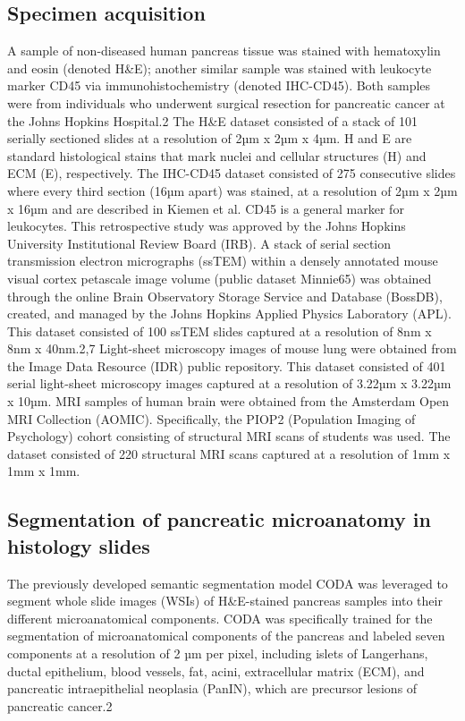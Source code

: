 \begin{refsection}
    \subsection{Specimen acquisition}
    A sample of non-diseased human pancreas tissue was stained with hematoxylin and eosin (denoted H\&E); another similar sample was stained with leukocyte marker CD45 via immunohistochemistry (denoted IHC-CD45). Both samples were from individuals who underwent surgical resection for pancreatic cancer at the Johns Hopkins Hospital.2 The H\&E dataset consisted of a stack of 101 serially sectioned slides at a resolution of 2µm x 2µm x 4µm. H and E are standard histological stains that mark nuclei and cellular structures (H) and ECM (E), respectively. The IHC-CD45 dataset consisted of 275 consecutive slides where every third section (16µm apart) was stained, at a resolution of 2µm x 2µm x 16µm and are described in Kiemen et al.\cite{kiemen2024a} CD45 is a general marker for leukocytes. This retrospective study was approved by the Johns Hopkins University Institutional Review Board (IRB).
    A stack of serial section transmission electron micrographs (ssTEM) within a densely annotated mouse visual cortex petascale image volume (public dataset Minnie65) was obtained through the online Brain Observatory Storage Service and Database (BossDB), created, and managed by the Johns Hopkins Applied Physics Laboratory (APL). This dataset consisted of 100 ssTEM slides captured at a resolution of 8nm x 8nm x 40nm.2,7
    Light-sheet microscopy images of mouse lung were obtained from the Image Data Resource (IDR) public repository.\cite{williams2017a,kubota2021a} This dataset consisted of 401 serial light-sheet microscopy images captured at a resolution of 3.22µm x 3.22µm x 10µm.
    MRI samples of human brain were obtained from the Amsterdam Open MRI Collection (AOMIC)\cite{snoek2021a}. Specifically, the PIOP2 (Population Imaging of Psychology) cohort consisting of structural MRI scans of students was used. The dataset consisted of 220 structural MRI scans captured at a resolution of 1mm x 1mm x 1mm. 
    
    \subsection{Segmentation of pancreatic microanatomy in histology slides}
    The previously developed semantic segmentation model CODA was leveraged to segment whole slide images (WSIs) of H\&E-stained pancreas samples into their different microanatomical components\cite{kiemen2022a,Crawford2024Combined,Braxton20243D}. CODA was specifically trained for the segmentation of microanatomical components of the pancreas and labeled seven components at a resolution of 2 µm per pixel, including islets of Langerhans, ductal epithelium, blood vessels, fat, acini, extracellular matrix (ECM), and pancreatic intraepithelial neoplasia (PanIN), which are precursor lesions of pancreatic cancer.2
    

\end{refsection}
